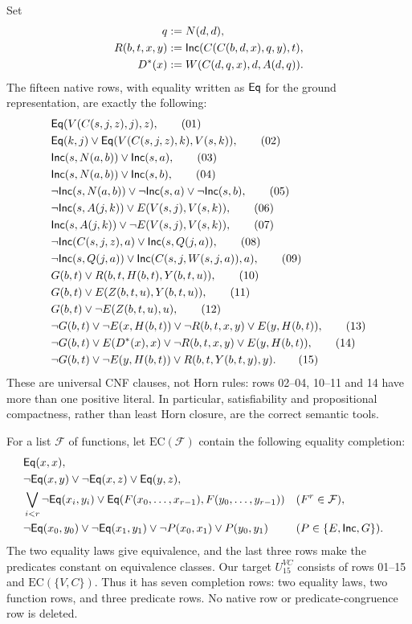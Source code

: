 Set
\begin{align*}
q&:=N(d,d),\\
R(b,t,x,y)&:=\mathsf{Inc}(C(C(b,d,x),q,y),t),\\
D^*(x)&:=W(C(d,q,x),d,A(d,q)).
\end{align*}
The fifteen native rows, with equality written as $\mathsf{Eq}$ for the ground
representation, are exactly the following:
\begin{align}
&\mathsf{Eq}(V(C(s,j,z),j),z),\tag{01}\\
&\mathsf{Eq}(k,j)\lor\mathsf{Eq}(V(C(s,j,z),k),V(s,k)),\tag{02}\\
&\mathsf{Inc}(s,N(a,b))\lor\mathsf{Inc}(s,a),\tag{03}\\
&\mathsf{Inc}(s,N(a,b))\lor\mathsf{Inc}(s,b),\tag{04}\\
&\neg\mathsf{Inc}(s,N(a,b))\lor\neg\mathsf{Inc}(s,a)\lor\neg\mathsf{Inc}(s,b),\tag{05}\\
&\neg\mathsf{Inc}(s,A(j,k))\lor E(V(s,j),V(s,k)),\tag{06}\\
&\mathsf{Inc}(s,A(j,k))\lor\neg E(V(s,j),V(s,k)),\tag{07}\\
&\neg\mathsf{Inc}(C(s,j,z),a)\lor\mathsf{Inc}(s,Q(j,a)),\tag{08}\\
&\neg\mathsf{Inc}(s,Q(j,a))\lor\mathsf{Inc}(C(s,j,W(s,j,a)),a),\tag{09}\\
&G(b,t)\lor R(b,t,H(b,t),Y(b,t,u)),\tag{10}\\
&G(b,t)\lor E(Z(b,t,u),Y(b,t,u)),\tag{11}\\
&G(b,t)\lor\neg E(Z(b,t,u),u),\tag{12}\\
&\neg G(b,t)\lor\neg E(x,H(b,t))\lor\neg R(b,t,x,y)
       \lor E(y,H(b,t)),\tag{13}\\
&\neg G(b,t)\lor E(D^*(x),x)\lor\neg R(b,t,x,y)
       \lor E(y,H(b,t)),\tag{14}\\
&\neg G(b,t)\lor\neg E(y,H(b,t))\lor R(b,t,Y(b,t,y),y).\tag{15}
\end{align}
These are universal CNF clauses, not Horn rules: rows 02--04, 10--11 and
14 have more than one positive literal. In particular, satisfiability
and propositional compactness, rather than least Horn closure, are the
correct semantic tools.

For a list $\mathcal F$ of functions, let $\mathrm{EC}(\mathcal F)$ contain
the following equality completion:
\begin{align*}
&\mathsf{Eq}(x,x),\\
&\neg\mathsf{Eq}(x,y)\lor\neg\mathsf{Eq}(x,z)\lor\mathsf{Eq}(y,z),\\
&\bigvee_{i<r}\neg\mathsf{Eq}(x_i,y_i)
  \lor\mathsf{Eq}(F(x_0,\ldots,x_{r-1}),F(y_0,\ldots,y_{r-1}))
  &&(F^r\in\mathcal F),\\
&\neg\mathsf{Eq}(x_0,y_0)\lor\neg\mathsf{Eq}(x_1,y_1)
  \lor\neg P(x_0,x_1)\lor P(y_0,y_1)
  &&(P\in\{E,\mathsf{Inc},G\}).
\end{align*}
The two equality laws give equivalence, and the last three rows make the
predicates constant on equivalence classes. Our target $U_{15}^{VC}$
consists of rows 01--15 and $\mathrm{EC}(\{V,C\})$. Thus it has seven
completion rows: two equality laws, two function rows, and three predicate
rows. No native row or predicate-congruence row is deleted.

